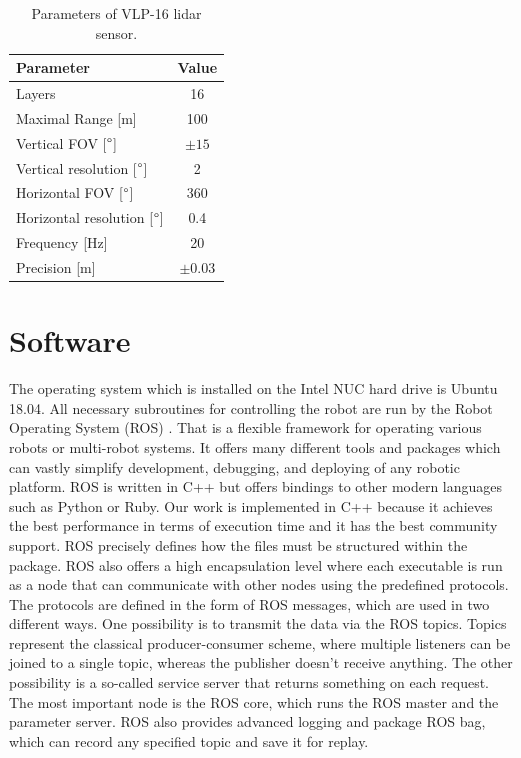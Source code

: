 \begin{table}[H]
\centering
\begin{tabular}{lc}
\toprule
Parameter & Value \\
\midrule
Layers                            & 16   \\ 
Maximal Range [m]                         & 100  \\
Vertical FOV [$\degree$]          & $\pm15$   \\ 
Vertical resolution [$\degree$]   & 2    \\ 
Horizontal FOV [$\degree$]        & 360  \\ 
Horizontal resolution [$\degree$] & 0.4  \\ 
Frequency [Hz]                    & 20    \\ 
Precision [m]                     & $\pm0.03$ \\ 
\bottomrule
\end{tabular}
\caption{Parameters of VLP-16 lidar sensor.}
\label{tab:lidar}
\end{table}

\section{Software}
The operating system which is installed on the Intel NUC hard drive is Ubuntu 18.04. All necessary subroutines for controlling the robot are run by the Robot Operating System (ROS) \cite{ros}. That is a flexible framework for operating various robots or multi-robot systems. It offers many different tools and packages which can vastly simplify development, debugging, and deploying of any robotic platform. ROS is written in C++ but offers bindings to other modern languages such as Python or Ruby. Our work is implemented in C++ because it achieves the best performance in terms of execution time and it has the best community support. ROS precisely defines how the files must be structured within the package. ROS also offers a high encapsulation level where each executable is run as a node that can communicate with other nodes using the predefined protocols. The protocols are defined in the form of ROS messages, which are used in two different ways. One possibility is to transmit the data via the ROS topics. Topics represent the classical producer-consumer scheme, where multiple listeners can be joined to a single topic, whereas the publisher doesn't receive anything. The other possibility is a so-called service server that returns something on each request. The most important node is the ROS core, which runs the ROS master and the parameter server. ROS also provides advanced logging and package ROS bag, which can record any specified topic and save it for replay.

